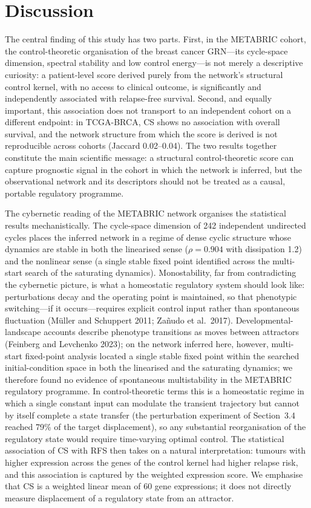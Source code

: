 \documentclass[12pt]{article}
\begin{document}
\section{Discussion}

The central finding of this study has two parts. First, in the METABRIC
cohort, the control-theoretic organisation of the breast cancer GRN---its
cycle-space dimension, spectral stability and low control energy---is not merely
a descriptive curiosity: a patient-level score derived purely from the
network's structural control kernel, with no access to clinical outcome, is
significantly and independently associated with relapse-free survival.
Second, and equally important, this association does not transport to an
independent cohort on a different endpoint: in TCGA-BRCA, CS shows no
association with overall survival, and the network structure from which the
score is derived is not reproducible across cohorts (Jaccard 0.02--0.04).
The two results together constitute the main scientific message: a
structural control-theoretic score can capture prognostic signal in the
cohort in which the network is inferred, but the observational network and
its descriptors should not be treated as a causal, portable regulatory
programme.

The cybernetic reading of the METABRIC network organises the statistical
results mechanistically. The cycle-space dimension of 242 independent undirected cycles places
the inferred network in a regime of dense cyclic structure whose dynamics are stable
in both the linearised sense ($\rho = 0.904$ with dissipation 1.2) and the
nonlinear sense (a single stable fixed point identified across the
multi-start search of the saturating dynamics).
Monostability, far from contradicting the cybernetic picture, is what a
homeostatic regulatory system should look like: perturbations decay and the
operating point is maintained, so that phenotypic switching---if it
occurs---requires explicit control input rather than spontaneous fluctuation
(M\"uller and Schuppert 2011; Za\~nudo et al.\ 2017). Developmental-
landscape accounts describe phenotype transitions as moves between
attractors (Feinberg and Levchenko 2023); on the network inferred here,
however, multi-start fixed-point analysis located a single stable fixed
point within the searched initial-condition space in both the linearised
and the saturating dynamics; we therefore found no evidence of spontaneous
multistability in the METABRIC regulatory programme. In control-theoretic terms
this is a homeostatic regime in which a single constant input can modulate
the transient trajectory but cannot by itself complete a state transfer (the
perturbation experiment of Section~3.4 reached 79\% of the target
displacement), so any substantial reorganisation of the regulatory state
would require time-varying optimal control. The statistical association of
CS with RFS then takes on a natural interpretation: tumours with higher
expression across the genes of the control kernel had higher relapse risk,
and this association is captured by the weighted expression score. We
emphasise that CS is a weighted linear mean of 60 gene expressions; it does
not directly measure displacement of a regulatory state from an attractor.
\end{document}
